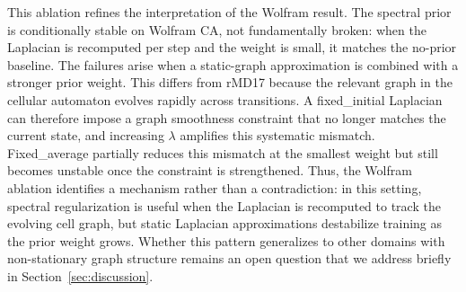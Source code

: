 This ablation refines the interpretation of the Wolfram result. The spectral prior is conditionally stable on Wolfram CA, not fundamentally broken: when the Laplacian is recomputed per step and the weight is small, it matches the no-prior baseline. The failures arise when a static-graph approximation is combined with a stronger prior weight. This differs from rMD17 because the relevant graph in the cellular automaton evolves rapidly across transitions. A fixed\_initial Laplacian can therefore impose a graph smoothness constraint that no longer matches the current state, and increasing \(\lambda\) amplifies this systematic mismatch. Fixed\_average partially reduces this mismatch at the smallest weight but still becomes unstable once the constraint is strengthened. Thus, the Wolfram ablation identifies a mechanism rather than a contradiction: in this setting, spectral regularization is useful when the Laplacian is recomputed to track the evolving cell graph, but static Laplacian approximations destabilize training as the prior weight grows. Whether this pattern generalizes to other domains with non-stationary graph structure remains an open question that we address briefly in Section~\ref{sec:discussion}.
